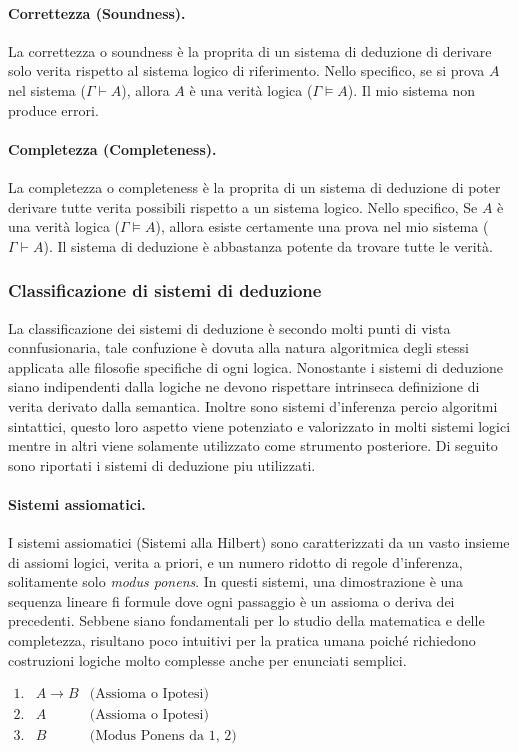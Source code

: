 \paragraph{Correttezza (Soundness).} 
La correttezza o soundness è la proprita di un sistema di deduzione di derivare solo verita rispetto al sistema logico di riferimento. Nello specifico,
se si prova $A$ nel sistema ($\Gamma \vdash A$), allora $A$ è una verità logica ($\Gamma \models A$). Il mio sistema non produce errori.

\paragraph{Completezza (Completeness).}
La completezza o completeness è la proprita di un sistema di deduzione di poter derivare tutte verita possibili rispetto a un sistema logico. Nello specifico,
Se $A$ è una verità logica ($\Gamma \models A$), allora esiste certamente una prova nel mio sistema ($\Gamma \vdash A$). Il sistema di deduzione è abbastanza 
potente da trovare tutte le verità.    

\subsubsection{Classificazione di sistemi di deduzione}
La classificazione dei sistemi di deduzione è secondo molti punti di vista connfusionaria, tale confuzione è dovuta alla natura algoritmica degli stessi applicata alle filosofie specifiche
di ogni logica. Nonostante i sistemi di deduzione siano indipendenti dalla logiche ne devono rispettare intrinseca definizione di verita derivato dalla semantica. Inoltre sono sistemi d'inferenza
percio algoritmi sintattici, questo loro aspetto viene potenziato e valorizzato in molti sistemi logici mentre in altri viene solamente utilizzato come strumento posteriore. Di seguito sono riportati
i sistemi di deduzione piu utilizzati. 

\paragraph{Sistemi assiomatici.}
I sistemi assiomatici (Sistemi alla Hilbert) sono caratterizzati da un vasto insieme di assiomi logici, verita a priori, e un numero ridotto di regole d'inferenza, solitamente solo \emph{modus ponens}.
In questi sistemi, una dimostrazione è una sequenza lineare fi formule dove ogni passaggio è un assioma o deriva dei precedenti. Sebbene siano fondamentali per lo studio della matematica e delle completezza,
risultano poco intuitivi per la pratica umana poiché richiedono costruzioni logiche molto complesse anche per enunciati semplici.
\begin{center}
    $\begin{array}{rll}
        1. & A \to B & \text{(Assioma o Ipotesi)}       \\
        2. & A        & \text{(Assioma o Ipotesi)}      \\
        3. & B        & \text{(Modus Ponens da 1, 2)}
    \end{array}$
\end{center}

